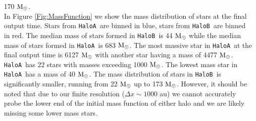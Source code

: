 \documentclass[twocolumn,iop,revtex4]{openjournal}
\newcommand{\msolar} {$\rm{M_{\odot}}~$}
\newcommand{\msolarc} {$\rm{M_{\odot}}$}
\newcommand{\ha} {\texttt{HaloA~}}
\newcommand{\hb} {\texttt{HaloB~}}
\begin{document}
170 \msolarc.\\
\indent In Figure \ref{Fig:MassFunction} we show the mass distribution of stars at the final
output time. Stars from \ha are binned in blue, stars from \hb are binned in red. The median mass
of stars formed in \hb is 44 \msolar while the median mass of stars formed in \ha is 683 \msolarc.
The most massive star in \ha at the final output time is 6127 \msolar with another star having a mass
of 4477 \msolarc. \ha has 22 stars with masses exceeding 1000 \msolarc. The lowest mass star in
\ha has a mass of 40 \msolarc. The mass distribution of stars in \hb is significantly smaller, running
from 22 \msolar up to 173 \msolarc. However, it should be noted that due to our finite resolution
($\Delta x \sim 1000$ au) we cannot accurately probe the lower end of the initial mass function
of either halo and we are likely missing some lower mass stars. 
\end{document}
